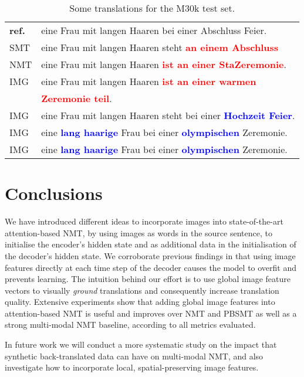 \documentclass[11pt,twocolumn]{article}
\newcommand{\redbf}[1]{\textbf{\textcolor{Red}{#1}}}
\newcommand{\bluebf}[1]{\textbf{\textcolor{Blue}{#1}}}
\begin{document}
\begin{table}[t!]
{\begin{tabular}{ll}
      \textbf{ref.} & eine Frau mit langen Haaren bei einer Abschluss Feier. \\
      
      SMT & eine Frau mit langen Haaren steht \redbf{an einem Abschluss} \\
      
      NMT & eine Frau mit langen Haaren \redbf{ist an einer StaZeremonie}. \\
      
      IMG & eine Frau mit langen Haaren \redbf{ist an einer warmen} \\
      & \redbf{Zeremonie teil}. \\
      
      IMG & eine Frau mit langen Haaren steht bei einer \bluebf{Hochzeit Feier}. \\
      
      IMG & eine \bluebf{lang haarige} Frau bei einer \bluebf{olympischen} Zeremonie. \\
      
      IMG & eine \bluebf{lang haarige} Frau bei einer \bluebf{olympischen} Zeremonie. \\
      
















      \bottomrule
    \end{tabular}
  }
  \caption{Some translations for the M30k test set.}
  \label{tbl:translation-examples}
\end{table}

\section{Conclusions}
\label{sec:conclusion}

We have introduced different ideas to incorporate images into state-of-the-art attention-based NMT,
by using images as words in the source sentence, to initialise the encoder's hidden state and
as additional data in the initialisation of the decoder's hidden state.
We corroborate previous findings in that using image features directly at each time step of the decoder causes the model to overfit and prevents learning.
The intuition behind our effort is to use global image feature vectors to visually \emph{ground} translations and consequently increase translation quality.
Extensive experiments show that adding global image features into attention-based NMT is useful and improves over NMT and PBSMT as well as a strong multi-modal NMT baseline, according to all metrics evaluated.

In future work we will
conduct a more systematic study on the impact that synthetic back-translated data can have on multi-modal NMT,
and also investigate how to incorporate local, spatial-preserving image features.



\end{document}

